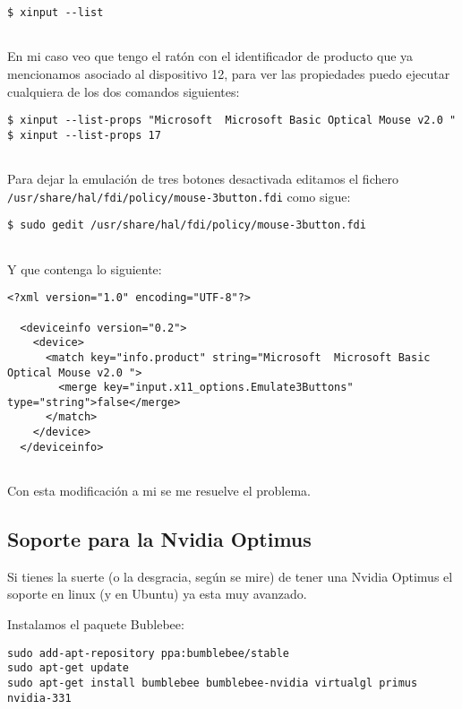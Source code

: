 \begin{verbatim}
$ xinput --list
      
\end{verbatim}

En mi caso veo que tengo el ratón con el identificador de producto que
ya mencionamos asociado al dispositivo 12, para ver las propiedades
puedo ejecutar cualquiera de los dos comandos siguientes:

\begin{verbatim}
$ xinput --list-props "Microsoft  Microsoft Basic Optical Mouse v2.0 "
$ xinput --list-props 17
      
\end{verbatim}

Para dejar la emulación de tres botones desactivada editamos el fichero
\texttt{/usr/share/hal/fdi/policy/mouse-3button.fdi} como sigue:

\begin{verbatim}
$ sudo gedit /usr/share/hal/fdi/policy/mouse-3button.fdi
      
\end{verbatim}

Y que contenga lo siguiente:

\begin{verbatim}
<?xml version="1.0" encoding="UTF-8"?>

  <deviceinfo version="0.2">
    <device>
      <match key="info.product" string="Microsoft  Microsoft Basic Optical Mouse v2.0 ">
        <merge key="input.x11_options.Emulate3Buttons" type="string">false</merge>
      </match>
    </device>
  </deviceinfo>
      
\end{verbatim}

Con esta modificación a mi se me resuelve el problema.

\subsection{Soporte para la Nvidia
Optimus}\label{soporte-para-la-nvidia-optimus}

Si tienes la suerte (o la desgracia, según se mire) de tener una Nvidia
Optimus el soporte en linux (y en Ubuntu) ya esta muy avanzado.

Instalamos el paquete Bublebee:

\begin{verbatim}
sudo add-apt-repository ppa:bumblebee/stable
sudo apt-get update
sudo apt-get install bumblebee bumblebee-nvidia virtualgl primus nvidia-331
      
\end{verbatim}

